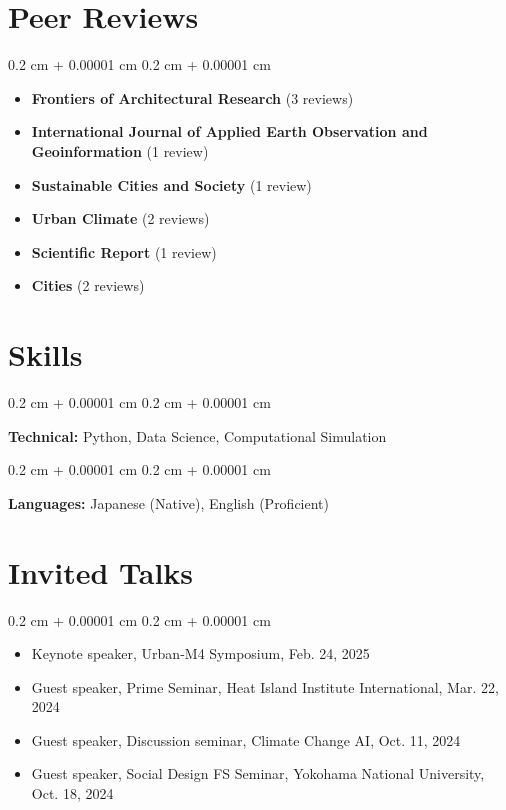 \documentclass[10pt, letterpaper]{article}
\newenvironment{highlightsforbulletentries}{
    \begin{itemize}[
        topsep=0.10 cm,
        parsep=0.10 cm,
        partopsep=0pt,
        itemsep=0pt,
        leftmargin=10pt
    ]
}{
    \end{itemize}
} %
\newenvironment{onecolentry}{
    \begin{adjustwidth}{
        0.2 cm + 0.00001 cm
    }{
        0.2 cm + 0.00001 cm
    }
}{
    \end{adjustwidth}
} %
\begin{document}
    \section{Peer Reviews}

    \begin{onecolentry}
        \begin{highlightsforbulletentries}
            \item \textbf{Frontiers of Architectural Research} (3 reviews)
            \item \textbf{International Journal of Applied Earth Observation and Geoinformation} (1 review)
            \item \textbf{Sustainable Cities and Society} (1 review)
            \item \textbf{Urban Climate} (2 reviews)
            \item \textbf{Scientific Report} (1 review)
            \item \textbf{Cities} (2 reviews)
        \end{highlightsforbulletentries}
    \end{onecolentry}

    \section{Skills}

    \begin{onecolentry}
        \textbf{Technical:} Python, Data Science, Computational Simulation
    \end{onecolentry}

    \vspace{0.2 cm}

    \begin{onecolentry}
        \textbf{Languages:} Japanese (Native), English (Proficient)
    \end{onecolentry}

    \section{Invited Talks}

    \begin{onecolentry}
        \begin{highlightsforbulletentries}
            \item Keynote speaker, Urban-M4 Symposium, Feb. 24, 2025
            \item Guest speaker, Prime Seminar, Heat Island Institute International, Mar. 22, 2024
            \item Guest speaker, Discussion seminar, Climate Change AI, Oct. 11, 2024
            \item Guest speaker, Social Design FS Seminar, Yokohama National University, Oct. 18, 2024
        \end{highlightsforbulletentries}
    \end{onecolentry}
\end{document}
